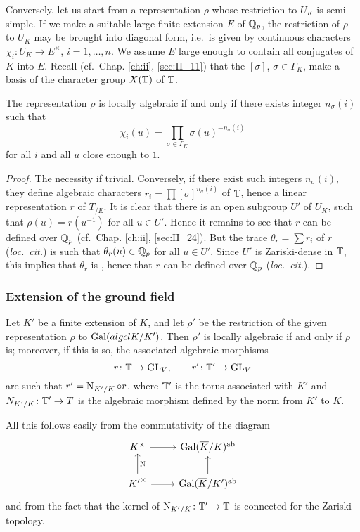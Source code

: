 Conversely, let us start from a representation $\rho$ whose restriction to $U_K$
is semi-simple. If we make a suitable large finite extension $E$ of $\mathbb{Q}_p$, the
restriction of $\rho$ to $U_K$ may be brought into diagonal form, i.e.\ is given
by continuous characters $\chi_i \colon U_K \to E^{\times}$, $i = 1,\dots,n$.
We assume $E$ large enough to contain all conjugates of $K$ into $E$. Recall
(cf.\ Chap. \ref{ch:ii}, \ref{sec:II_11}) that the $[\sigma]$, $\sigma\in
\Gamma_K$, make a basis of the character group $X(\mathbb{T})$ of $\mathbb{T}$.

\begin{prop}\label{prop:III_11_2}
The representation $\rho$ is locally algebraic if and only if there exists
integer $n_\sigma(i)$ such that
\dpage
\[
	\chi_i(u) = \prod_{\sigma \in \Gamma_K} \sigma(u)^{-n_\sigma(i)}
\]
for all $i$ and all $u$ close enough to $1$.
\end{prop}
\begin{proof}
The necessity if trivial. Conversely, if there exist such integers
$n_\sigma(i)$, they define algebraic characters $r_i = \prod
[\sigma]^{n_\sigma(i)}$ of $\mathbb{T}$, hence a linear representation $r$ of $T_{/E}$.
It is clear that there is an open subgroup $U'$ of $U_K$, such that $\rho(u) =
r(u^{-1})$ for all $u \in U'$. Hence it remains to see that $r$ can be defined
over $\mathbb{Q}_p$ (cf.\ Chap. \ref{ch:ii}, \ref{sec:II_24}). But the trace $\theta_r =
\sum r_i$ of $r$ (\emph{loc.\ cit.}) is such that $\theta_r(u) \in \mathbb{Q}_p$ for all $u
\in U'$. Since $U'$ is Zariski-dense in $\mathbb{T}$, this implies that $\theta_r$ is
, hence that $r$ can be defined over $\mathbb{Q}_p$
(\emph{loc.\ cit.}).
\end{proof}
 
\subsubsection*{Extension of the ground field}
Let $K'$ be a finite extension of $K$, and let $\rho'$ be the restriction of the
given representation $\rho$ to $\operatorname{Gal}(algcl{K}/K')$. Then $\rho'$ is locally
algebraic if and only if
$\rho$ is; moreover, if this is so, the associated algebraic morphisms
\[
r \colon \mathbb{T} \to \operatorname{GL}_V, \qquad r' \colon \mathbb{T}' \to \operatorname{GL}_V
\]
are such that $r' = \operatorname{N}_{K'/K} \circ r$, where $\mathbb{T}'$ is the
torus associated with $K'$ and $N_{K'/K} \colon \mathbb{T}' \to T$ is the algebraic
morphism defined by the norm from $K'$ to $K$.

All this follows easily from the commutativity of the diagram
\dpage
\[\begin{tikzcd}
	{K^\times} & {\abcl{\Gal(\algcl K/K)}} \\
	{{K'}^\times} & {\abcl{\Gal(\algcl K/K')}}
	\arrow[from=1-1, to=1-2]
	\arrow["\Nm"', from=2-1, to=1-1]
	\arrow[from=2-1, to=2-2]
	\arrow[from=2-2, to=1-2]
\end{tikzcd}\]
and from the fact that the kernel of $\operatorname{N}_{K'/K} \colon \mathbb{T}' \to \mathbb{T}$ is connected
for the Zariski topology.

